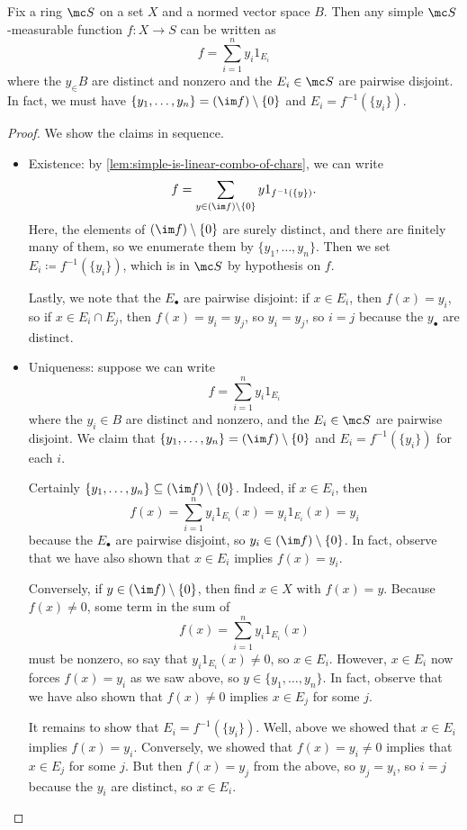 \documentclass[../notes.tex]{subfiles}
\begin{document}
\begin{lemma}
	Fix a ring $\mc S$ on a set $X$ and a normed vector space $B$. Then any simple $\mc S$-measurable function $f\colon X\to S$ can be written as
	\[f=\sum_{i=1}^ny_i1_{E_i}\]
	where the $y_\in B$ are distinct and nonzero and the $E_i\in\mc S$ are pairwise disjoint. In fact, we must have $\{y_1,\ldots,y_n\}=(\im f)\setminus\{0\}$ and $E_i=f^{-1}(\{y_i\})$.
\end{lemma}
\begin{proof}
	We show the claims in sequence.
	\begin{itemize}
		\item Existence: by \autoref{lem:simple-is-linear-combo-of-chars}, we can write
		\[f=\sum_{y\in(\im f)\setminus\{0\}}y1_{f^{-1}(\{y\})}.\]
		Here, the elements of $(\im f)\setminus\{0\}$ are surely distinct, and there are finitely many of them, so we enumerate them by $\{y_1,\ldots,y_n\}$. Then we set $E_i\coloneqq f^{-1}(\{y_i\})$, which is in $\mc S$ by hypothesis on $f$.

		Lastly, we note that the $E_\bullet$ are pairwise disjoint: if $x\in E_i$, then $f(x)=y_i$, so if $x\in E_i\cap E_j$, then $f(x)=y_i=y_j$, so $y_i=y_j$, so $i=j$ because the $y_\bullet$ are distinct.

		\item Uniqueness: suppose we can write
		\[f=\sum_{i=1}^ny_i1_{E_i}\]
		where the $y_i\in B$ are distinct and nonzero, and the $E_i\in\mc S$ are pairwise disjoint. We claim that $\{y_1,\ldots,y_n\}=(\im f)\setminus\{0\}$ and $E_i=f^{-1}(\{y_i\})$ for each $i$.

		Certainly $\{y_1,\ldots,y_n\}\subseteq(\im f)\setminus\{0\}$. Indeed, if $x\in E_i$, then
		\[f(x)=\sum_{i=1}^ny_i1_{E_i}(x)=y_i1_{E_i}(x)=y_i\]
		because the $E_\bullet$ are pairwise disjoint, so $y_i\in(\im f)\setminus\{0\}$. In fact, observe that we have also shown that $x\in E_i$ implies $f(x)=y_i$.
		
		Conversely, if $y\in(\im f)\setminus\{0\}$, then find $x\in X$ with $f(x)=y$. Because $f(x)\ne0$, some term in the sum of
		\[f(x)=\sum_{i=1}^ny_i1_{E_i}(x)\]
		must be nonzero, so say that $y_i1_{E_i}(x)\ne0$, so $x\in E_i$. However, $x\in E_i$ now forces $f(x)=y_i$ as we saw above, so $y\in\{y_1,\ldots,y_n\}$. In fact, observe that we have also shown that $f(x)\ne0$ implies $x\in E_j$ for some $j$.

		It remains to show that $E_i=f^{-1}(\{y_i\})$. Well, above we showed that $x\in E_i$ implies $f(x)=y_i$. Conversely, we showed that $f(x)=y_i\ne0$ implies that $x\in E_j$ for some $j$. But then $f(x)=y_j$ from the above, so $y_j=y_i$, so $i=j$ because the $y_i$ are distinct, so $x\in E_i$.
		\qedhere
	\end{itemize}
\end{proof}
\end{document}
